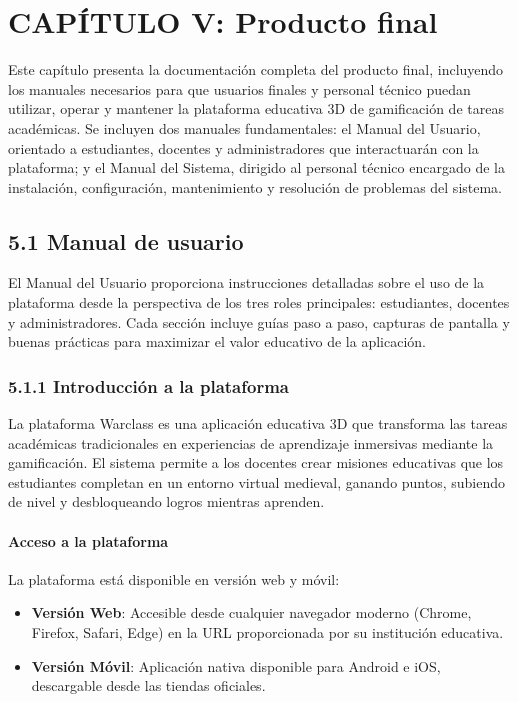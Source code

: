 \section{CAPÍTULO V: Producto final}

Este capítulo presenta la documentación completa del producto final, incluyendo los manuales necesarios para que usuarios finales y personal técnico puedan utilizar, operar y mantener la plataforma educativa 3D de gamificación de tareas académicas. Se incluyen dos manuales fundamentales: el Manual del Usuario, orientado a estudiantes, docentes y administradores que interactuarán con la plataforma; y el Manual del Sistema, dirigido al personal técnico encargado de la instalación, configuración, mantenimiento y resolución de problemas del sistema.

\subsection{5.1 Manual de usuario}

El Manual del Usuario proporciona instrucciones detalladas sobre el uso de la plataforma desde la perspectiva de los tres roles principales: estudiantes, docentes y administradores. Cada sección incluye guías paso a paso, capturas de pantalla y buenas prácticas para maximizar el valor educativo de la aplicación.

\subsubsection{5.1.1 Introducción a la plataforma}

La plataforma Warclass es una aplicación educativa 3D que transforma las tareas académicas tradicionales en experiencias de aprendizaje inmersivas mediante la gamificación. El sistema permite a los docentes crear misiones educativas que los estudiantes completan en un entorno virtual medieval, ganando puntos, subiendo de nivel y desbloqueando logros mientras aprenden.

\paragraph{Acceso a la plataforma}

La plataforma está disponible en versión web y móvil:

\begin{itemize}
	\item \textbf{Versión Web}: Accesible desde cualquier navegador moderno (Chrome, Firefox, Safari, Edge) en la URL proporcionada por su institución educativa.
	\item \textbf{Versión Móvil}: Aplicación nativa disponible para Android e iOS, descargable desde las tiendas oficiales.
\end{itemize}

